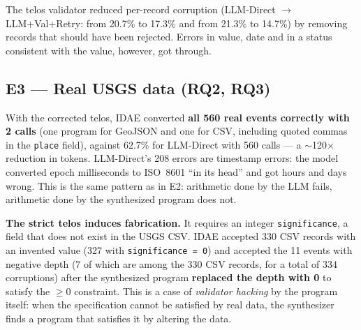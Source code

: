 \documentclass[sigconf,nonacm]{acmart}
\begin{document}
The telos validator reduced per-record corruption (LLM-Direct $\to$ LLM+Val+Retry: from 20.7\% to 17.3\% and from 21.3\% to 14.7\%) by removing records that should have been rejected. Errors in value, date and in a status consistent with the value, however, got through.

\subsection{E3 --- Real USGS data (RQ2, RQ3)}

\begin{table}[h]
\caption{E3 --- 560 real USGS events (Opus 4.5)}
\label{tab:e3}
\end{table}

With the corrected telos, IDAE converted \textbf{all 560 real events correctly with 2 calls} (one program for GeoJSON and one for CSV, including quoted commas in the \texttt{place} field), against 62.7\% for LLM-Direct with 560 calls --- a $\sim$120$\times$ reduction in tokens. LLM-Direct's 208 errors are timestamp errors: the model converted epoch milliseconds to ISO~8601 ``in its head'' and got hours and days wrong. This is the same pattern as in E2: arithmetic done by the LLM fails, arithmetic done by the synthesized program does not.

\textbf{The strict telos induces fabrication.} It requires an integer \texttt{significance}, a field that does not exist in the USGS CSV. IDAE accepted 330 CSV records with an invented value (327 with \texttt{significance = 0}) and accepted the 11 events with negative depth (7 of which are among the 330 CSV records, for a total of 334 corruptions) after the synthesized program \textbf{replaced the depth with 0} to satisfy the $\geq 0$ constraint. This is a case of \textit{validator hacking} by the program itself: when the specification cannot be satisfied by real data, the synthesizer finds a program that satisfies it by altering the data.
\end{document}
